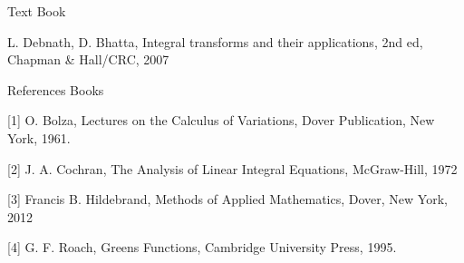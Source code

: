 Text Book

L. Debnath, D. Bhatta, Integral transforms and their applications, 2nd ed, Chapman \& Hall/CRC, 2007

References Books 

[1] O. Bolza, Lectures on the Calculus of Variations, Dover Publication, New York, 1961.

[2] J. A. Cochran, The Analysis of Linear Integral Equations, McGraw-Hill, 1972

[3] Francis B. Hildebrand, Methods of Applied Mathematics, Dover, New York, 2012

[4] G. F. Roach, Greens Functions, Cambridge University Press, 1995.
